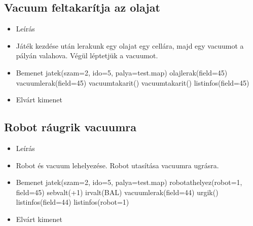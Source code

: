 \subsection{Vacuum feltakarítja az olajat}
\begin{itemize}
	\item Leírás\newline
	\item Játék kezdése után lerakunk egy olajat egy cellára, majd egy vacuumot a pályán valahova. Végül léptetjük a vacuumot.
	\item Bemenet\newline
		jatek(szam=2, ido=5, palya=test.map) \newline
		olajlerak(field=45) \newline
		vacuumlerak(field=45) \newline
		vacuumtakarit() \newline
		vacuumtakarit() \newline
		listinfos(field=45) \newline
	\item Elvárt kimenet\newline
\end{itemize}

\subsection{Robot ráugrik vacuumra}
\begin{itemize}
	\item Leírás\newline
	\item Robot és vacuum lehelyezése. Robot utasítása vacuumra ugrásra.
	\item Bemenet\newline
		jatek(szam=2, ido=5, palya=test.map) \newline
		robotathelyez(robot=1, field=45) \newline
		sebvalt(+1) \newline
		irvalt(BAL) \newline
		vacuumlerak(field=44) \newline
		urgik() \newline
		listinfos(field=44) \newline
		listinfos(robot=1) \newline
	\item Elvárt kimenet\newline
\end{itemize}

